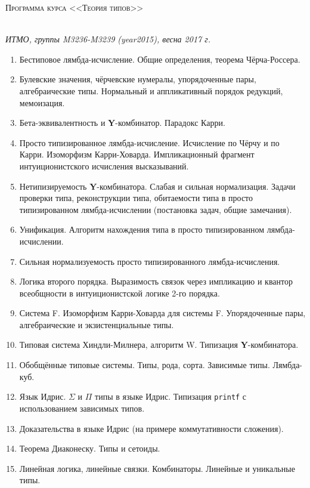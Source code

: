 \documentclass[12pt,a4paper,oneside]{book}
\begin{document}
\pagestyle{empty}

\begin{center}
\begin{Large}\scshape Программа курса <<Теория типов>>\end{Large}\\\vspace{0.1cm}
\textit{ИТМО, группы M3236-M3239 (year2015), весна 2017 г.}
\end{center}
\vspace{0.5cm}

\begin{enumerate}
\item Бестиповое лямбда-исчисление. Общие определения, теорема Чёрча-Россера.
\item Булевские значения, чёрчевские нумералы, упорядоченные пары, 
алгебраические типы. Нормальный и аппликативный порядок редукций, мемоизация.
\item Бета-эквивалентность и \textbf{Y}-комбинатор. Парадокс Карри.
\item Просто типизированное лямбда-исчисление. Исчисление по Чёрчу и по Карри.
Изоморфизм Карри-Ховарда. Импликационный фрагмент интуиционистского исчисления высказываний.
\item Нетипизируемость \textbf{Y}-комбинатора. Слабая и сильная нормализация. Задачи проверки типа, 
реконструкции типа, обитаемости типа в просто типизированном лямбда-исчислении
(постановка задач, общие замечания).
\item Унификация. Алгоритм нахождения типа в просто типизированном лямбда-исчислении.
\item Сильная нормализуемость просто типизированного лямбда-исчисления.
\item Логика второго порядка. Выразимость связок через импликацию и квантор всеобщности в интуиционистской логике 2-го порядка.
\item Система F. Изоморфизм Карри-Ховарда для системы F. Упорядоченные пары, алгебраические и экзистенциальные типы.
\item Типовая система Хиндли-Милнера, алгоритм W. Типизация \textbf{Y}-комбинатора.
\item Обобщённые типовые системы. Типы, рода, сорта. Зависимые типы. Лямбда-куб.
\item Язык Идрис. $\Sigma$ и $\Pi$ типы в языке Идрис. Типизация \texttt{printf} с использованием зависимых типов.
\item Доказательства в языке Идрис (на примере коммутативности сложения).
\item Теорема Диаконеску. Типы и сетоиды.
\item Линейная логика, линейные связки. Комбинаторы. Линейные и уникальные типы.
\end{enumerate}
\end{document}
